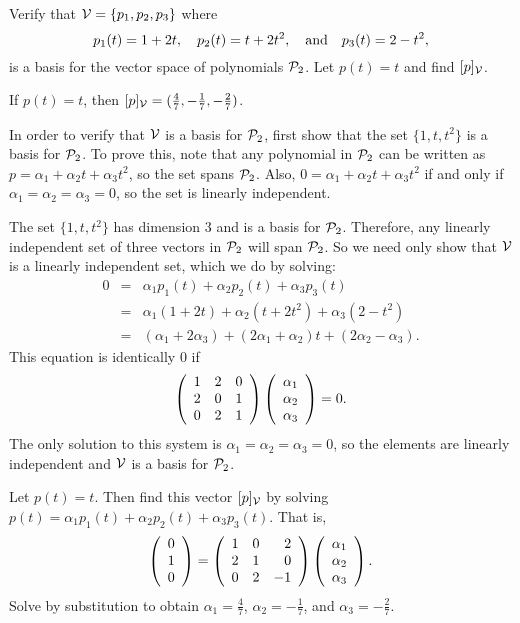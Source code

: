 \documentclass{ximera}
\begin{document}
\begin{exercise} \label{c7.1.4}
Verify that ${\cal V}= \{p_1,p_2,p_3\}$ where
\[
p_1(t)=1+2t, \quad p_2(t)=t+2t^2, \quad\mbox{and}\quad p_3(t)=2-t^2,
\]
is a basis for the vector space of polynomials ${\cal P}_2$.
Let $p(t)=t$ and find $[p]_{\cal V}$.

\begin{solution}

\ans If $p(t) = t$, then
$[p]_{\cal V} = (\frac{4}{7}, -\frac{1}{7}, -\frac{2}{7})$.

\soln In order to verify that ${\cal V}$ is a basis for ${\cal P}_2$, first
show that the set $\{1,t,t^2\}$ is a basis for ${\cal P}_2$.  To prove
this, note that any polynomial in ${\cal P}_2$ can be written as
$p = \alpha_1 + \alpha_2t + \alpha_3t^2$, so the set spans ${\cal P}_2$.
Also, $0 = \alpha_1 + \alpha_2t + \alpha_3t^2$ if and only if
$\alpha_1 = \alpha_2 = \alpha_3 = 0$, so the set is linearly
independent.

\para The set $\{1,t,t^2\}$ has dimension 3 and is a basis for
${\cal P}_2$.  Therefore, any linearly independent set of three vectors
in ${\cal P}_2$ will span ${\cal P}_2$.  So we need only show that
${\cal V}$ is a linearly independent set, which we do by solving:
\[
\begin{array}{rcl}
0 & = & \alpha_1p_1(t) + \alpha_2p_2(t) + \alpha_3p_3(t) \\
& = & \alpha_1(1 + 2t) + \alpha_2(t + 2t^2) + \alpha_3(2 - t^2) \\
& = & (\alpha_1 + 2\alpha_3) + (2\alpha_1 + \alpha_2)t +
(2\alpha_2 - \alpha_3). \end{array}
\]
This equation is identically $0$ if
\[
\left(\begin{array}{rrr} 1 & 2 & 0 \\ 2 & 0 & 1 \\ 0 & 2 & 1\end{array}\right)\left(\begin{array}{r} \alpha_1 \\ \alpha_2 \\ \alpha_3\end{array}\right) = 0.
\]
The only solution to this system is $\alpha_1 = \alpha_2 = \alpha_3
 = 0$, so the elements are linearly independent and ${\cal V}$ is
a basis for ${\cal P}_2$.

\para Let $p(t) = t$.  Then find this vector $[p]_{\cal V}$ by solving
$p(t) = \alpha_1p_1(t) + \alpha_2p_2(t) + \alpha_3p_3(t)$. 
That is,
\[ \left(\begin{array}{r} 0 \\ 1 \\ 0\end{array}\right) = \left(\begin{array}{rrr} 1 & 0 & 2 \\ 2 & 1 & 0 \\ 0 & 2 & -1\end{array}\right)
\left(\begin{array}{r} \alpha_1 \\ \alpha_2 \\ \alpha_3\end{array}\right). \]
Solve by substitution to obtain $\alpha_1 = \frac{4}{7}$, $\alpha_2
= -\frac{1}{7}$, and $\alpha_3 = -\frac{2}{7}$.

\end{solution}
\end{exercise}

\CEXER
\end{document}
